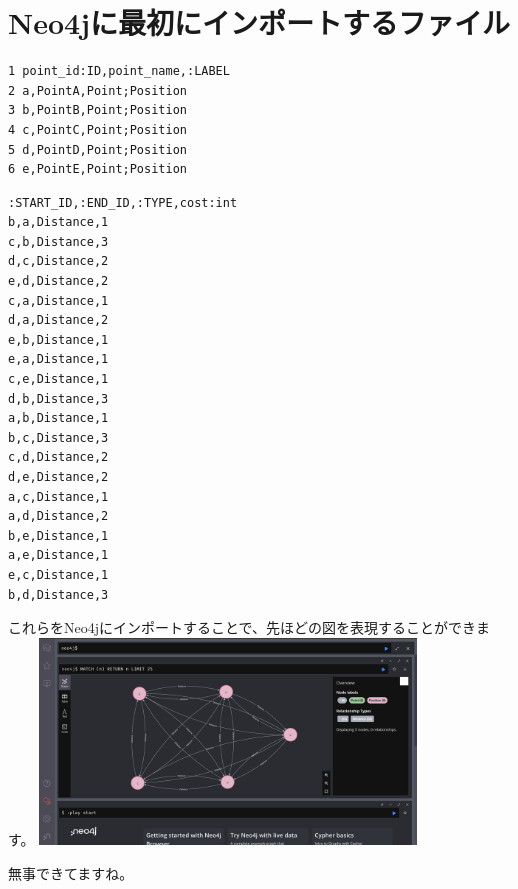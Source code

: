 \section{Neo4jに最初にインポートするファイル}

\begin{tcolorbox}[title=point.csv]
    \begin{verbatim}
1 point_id:ID,point_name,:LABEL
2 a,PointA,Point;Position
3 b,PointB,Point;Position
4 c,PointC,Point;Position
5 d,PointD,Point;Position
6 e,PointE,Point;Position
\end{verbatim}
\end{tcolorbox}


\begin{tcolorbox}[title=route.csv]
    \begin{verbatim}
:START_ID,:END_ID,:TYPE,cost:int
b,a,Distance,1
c,b,Distance,3
d,c,Distance,2
e,d,Distance,2
c,a,Distance,1
d,a,Distance,2
e,b,Distance,1
e,a,Distance,1
c,e,Distance,1
d,b,Distance,3
a,b,Distance,1
b,c,Distance,3
c,d,Distance,2
d,e,Distance,2
a,c,Distance,1
a,d,Distance,2
b,e,Distance,1
a,e,Distance,1
e,c,Distance,1
b,d,Distance,3
\end{verbatim}
\end{tcolorbox}
これらをNeo4jにインポートすることで、先ほどの図を表現することができます。
\includegraphics[width=10cm]{./image/03-Tech/chap3/neo4j_result.png}

無事できてますね。


